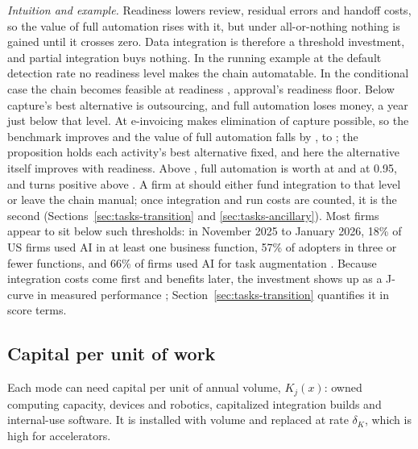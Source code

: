 \noindent\emph{Intuition and example.} Readiness lowers review, residual errors and handoff costs, so the value of full automation rises with it, but under all-or-nothing nothing is gained until it crosses zero. Data integration is therefore a threshold investment, and partial integration buys nothing. In the running example at the default detection rate no readiness level makes the chain automatable. In the conditional case the chain becomes feasible at readiness \icIotaChainFeas, approval's readiness floor. Below \icIotaN{} capture's best alternative is outsourcing, and full automation loses money, \icWbelowN{} a year just below that level. At \icIotaN{} e-invoicing makes elimination of capture possible, so the benchmark improves and the value of full automation falls by \icWdropN, to \icWaboveN; the proposition holds each activity's best alternative fixed, and here the alternative itself improves with readiness. Above \icIotaN, full automation is worth \icWfullHigh{} at \icIotaHigh{} and \icWninetyfive{} at 0.95, and turns positive above \icIotaStarN. A firm at \icIotaLow{} should either fund integration to that level or leave the chain manual; once integration and run costs are counted, it is the second (Sections~\ref{sec:tasks-transition} and \ref{sec:tasks-ancillary}). Most firms appear to sit below such thresholds: in November 2025 to January 2026, 18\% of US firms used AI in at least one business function, 57\% of adopters in three or fewer functions, and 66\% of firms used AI for task augmentation \citep{bonney2026microstructure}. Because integration costs come first and benefits later, the investment shows up as a J-curve in measured performance \citep{brynjolfsson2021productivity}; Section~\ref{sec:tasks-transition} quantifies it in score terms.

\subsection{Capital per unit of work}\label{sec:tasks-capital}

Each mode can need capital per unit of annual volume, $K_j(x)$: owned computing capacity, devices and robotics, capitalized integration builds and internal-use software. It is installed with volume and replaced at rate $\delta_K$, which is high for accelerators.

